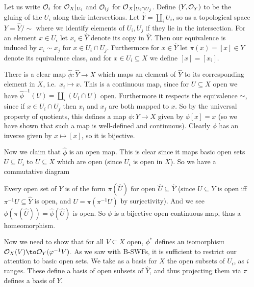     Let us write ${{\cal O}}_i$ for ${{\cal O}}_X|_{U_i}$ and ${{\cal O}}_{ij}$ for ${{\cal O}}_X|_{U_i\cap U_j}$.
    Define $(Y,{{\cal O}}_Y)$ to be the gluing of the $U_i$ along their intersections.
    Let $\hat Y=\coprod_iU_i$, so as a topological space $Y=\hat Y/{\sim}$ where we identify elements of $U_i,U_j$ if they lie in the intersection.
    For an element $x\in U_i$ let $x_i\in\hat Y$ denote its copy in $\hat Y$.
    Then our equivalence is induced by $x_i\sim x_j$ for $x\in U_i\cap U_j$.
    Furthermore for $x\in\hat Y$ let $\pi(x)=[x]\in Y$ denote its equivalence class, and for $x\in U_i\subseteq X$ we define $[x]=[x_i]$.

    There is a clear map $\hat\phi\colon\hat Y\to X$ which maps an element of $\hat Y$ to its corresponding element in $X$, i.e.\ $x_i\mapsto x$.
    This is a continuous map, since for $U\subseteq X$ open we have $\hat\phi^{-1}(U)=\coprod_i(U_i\cap U)$ open.
    Furthermore it respects the equivalence $\sim$, since if $x\in U_i\cap U_j$ then $x_i$ and $x_j$ are both mapped to $x$.
    So by the universal property of quotients, this defines a map $\phi\colon Y\to X$ given by $\phi[x]=x$ (so we have shown that such a map is well-defined and continuous).
    Clearly $\phi$ has an inverse given by $x\mapsto[x]$, so it is bijective.

    Now we claim that $\hat\phi$ is an open map.
    This is clear since it maps basic open sets $U\subseteq U_i$ to $U\subseteq X$ which are open (since $U_i$ is open in $X$).
    So we have a commutative diagram

    \bigskip
    \centerline{}

    Every open set of $Y$ is of the form $\pi(\hat U)$ for open $\hat U\subseteq\hat Y$ (since $U\subseteq Y$ is open iff $\pi^{-1}U\subseteq\hat Y$ is open, and $U=\pi(\pi^{-1}U)$ by surjectivity).
    And we see $\phi(\pi(\hat U))=\hat\phi(\hat U)$ is open.
    So $\phi$ is a bijective open continuous map, thus a homeomorphism.

    Now we need to show that for all $V\subseteq X$ open, $\phi^*$ defines an isomorphism $\O_X(V)\to\O_Y(\phi^{-1}V)$.
    As we saw with B-SWFs, it is sufficient to restrict our attention to basic open sets.
    We take as a basis for $X$ the open subsets of $U_i$, as $i$ ranges.
    These define a basis of open subsets of $\hat Y$, and thus projecting them via $\pi$ defines a basis of $Y$.

